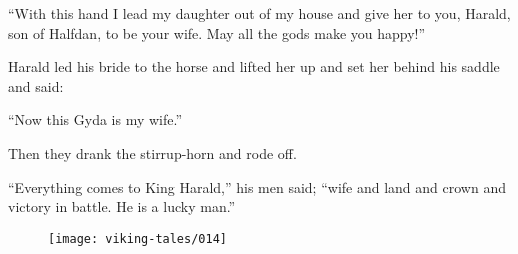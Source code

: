 ``With this hand I lead my daughter out of my house and give her to you,
Harald, son of Halfdan, to be your wife. May all the gods make you
happy!''

Harald led his bride to the horse and lifted her up and set her behind
his saddle and said:

``Now this Gyda is my wife.''

Then they drank the stirrup-horn and rode off.

``Everything comes to King Harald,'' his men said; ``wife and land and
crown and victory in battle. He is a lucky man.''

\begin{figure}[hb]
    \centering
    \vskip8pt
    \texttt{[image: viking-tales/014]}
\end{figure}
